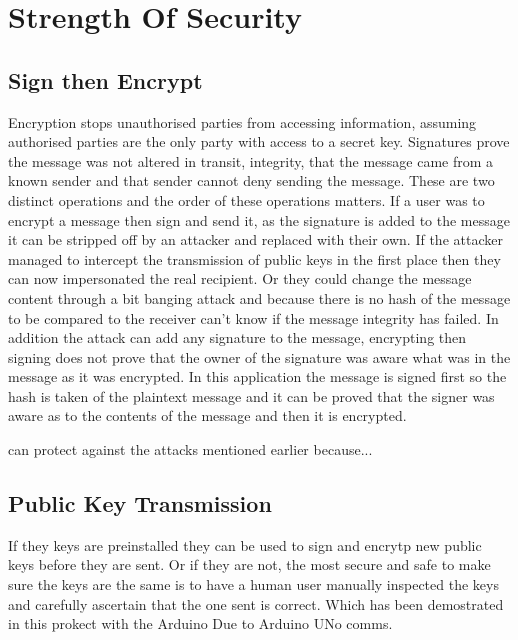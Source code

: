 
\chapter{Strength Of Security}
\label{stre}


\section{Sign then Encrypt}

Encryption stops unauthorised parties from accessing information, assuming authorised parties are the only party with access to a secret key. Signatures prove the message was not altered in transit, integrity, that the message came from a known sender and that sender cannot deny sending the message. These are two distinct operations and the order of these operations matters. If a user was to encrypt a message then sign and send it, as the signature is added to the message it can be stripped off by an attacker and replaced with their own. If the attacker managed to intercept the transmission of public keys in the first place then they can now impersonated the real recipient. Or they could change the message content through a bit banging attack and because there is no hash of the message to be compared to the receiver can't know if the message integrity has failed. In addition the attack can add any signature to the message, encrypting then signing does not prove that the owner of the signature was aware what was in the message as it was encrypted. In this application the message is signed first so the hash is taken of the plaintext message and it can be proved that the signer was aware as to the contents of the message and then it is encrypted.

can protect against the attacks mentioned earlier because...


\section{Public Key Transmission}

If they keys are preinstalled they can be used to sign and encrytp new public keys before they are sent. Or if they are not, the most secure and safe to make sure the keys are the same is to have a human user manually inspected the keys and carefully ascertain that the one sent is correct. Which has been demostrated in this prokect with the Arduino Due to Arduino UNo comms.



